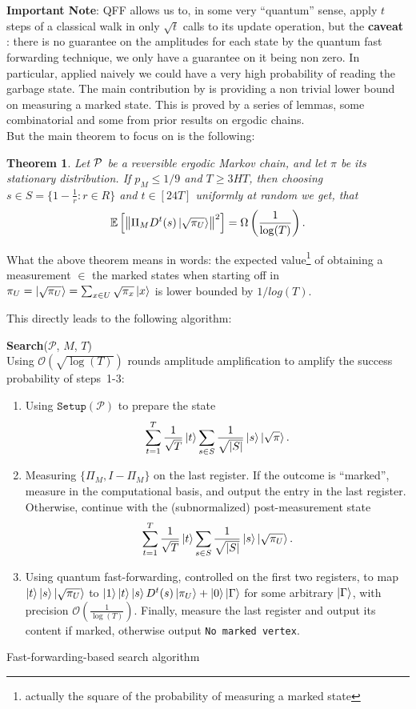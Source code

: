 \documentclass{article}
\newcommand{\nrm}[1]{\left\lVert #1 \right\rVert}
\newcommand{\bigO}[1]{\mathcal{O}\left( #1 \right)}
\newcommand{\PM}{\mathcal{P}}
\newtheorem{theorem}{Theorem}
\newcommand{\setup}{\mathtt{Setup}}
\begin{document}
\textbf{Important Note}: QFF allows us to, in some very ``quantum'' sense, apply $t$ steps of a classical walk in only $\sqrt{t}$ calls to its update operation, but the \textbf{caveat} : there is no guarantee on the amplitudes for each state by the quantum fast forwarding technique, we only have a guarantee on it being non zero. In particular, applied naively we could have a very high probability of reading the garbage state.
The main contribution by \cite{Ambainis2019QuadraticSF} is providing a non trivial lower bound on measuring a marked state. This is proved by a series of lemmas, some combinatorial and some from prior results on ergodic chains. \\ But the main theorem to focus on is the following:
\begin{theorem}
	Let $\cal P$ be a reversible ergodic Markov chain, and let $\pi$ be its stationary distribution.
	If $p_M\leq 1/9$ and $T\geq 3HT$, then choosing $s\in S=\{1-\frac{1}{r}:r\in R\}$ and $t\in [24T]$ uniformly at random we get, that 
	$$\mathbb{E}\left[\nrm{\Pi_M D^t(s)\ket{\sqrt{\pi_U}}}^2\right]= \Omega\left(\frac{1}{\log(T)}\right).$$
\end{theorem}\label{cor:AMRMS}
What the above theorem \label{cor:AMRMS} means in words: the expected value\footnote{actually the square of the probability of measuring a marked state} of obtaining a measurement $\in$ the marked states when starting off in $\pi_U =\ket{\sqrt{\pi_U}}=\sum_{x\in U}\sqrt{\pi_x}\ket{x}$ is lower bounded by $1/log(T)$.

This directly leads to the following algorithm:

\begin{algorithm}[H]
	\textbf{Search}($ \PM $, $ M $, $T$)\\ %
	Using $\bigO{\!\!\sqrt{\log(T)}}\!$ rounds amplitude amplification to amplify the success probability of steps~1-$3$:
	\begin{enumerate}
		\item Using $\setup(\PM)$ to prepare the state $$\sum_{t=1}^{T}\frac{1}{\sqrt{T}}\ket{t}\sum_{s\in S}\frac{1}{\sqrt{|S|}}\ket{s}\ket{\sqrt{\pi}}.$$
		\item Measuring $\{\Pi_M,I-\Pi_M\}$ on the last register. If the outcome is ``marked'', measure in the computational basis, and output the entry in the last register. Otherwise, continue with the (subnormalized) post-measurement state %
		$$\sum_{t=1}^{T}\frac{1}{\sqrt{T}}\ket{t}\sum_{s\in S}\frac{1}{\sqrt{|S|}}\ket{s}\ket{\sqrt{\pi_U}}.$$
		\item Using quantum fast-forwarding, controlled on the first two registers, to map $\ket{t}\ket{s}\ket{\sqrt{\pi_U}}$ to $\ket{1}\ket{t}\ket{s}D^t(s)\ket{\pi_U}+\ket{0}\ket{\Gamma}$ for some arbitrary $\ket{\Gamma}$, with precision $\bigO{\frac{1}{\log(T)}}$. Finally, measure the last register and output its content if marked, otherwise output \texttt{No marked vertex}.
	\end{enumerate}
	\caption{Fast-forwarding-based search algorithm}\label{alg:alg2}
\end{algorithm}
\end{document}
